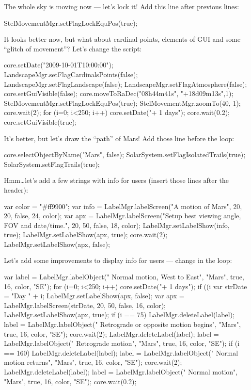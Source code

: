 The whole sky is moving now --- let's lock it! Add this line 
after previous lines:
\begin{script}
StelMovementMgr.setFlagLockEquPos(true);
\end{script}

It looks better now, but what about cardinal points, 
elements of GUI and some ``glitch of movement''? 
Let's change the script:
\begin{script}
core.setDate("2009-10-01T10:00:00");
LandscapeMgr.setFlagCardinalsPoints(false);
LandscapeMgr.setFlagLandscape(false);
LandscapeMgr.setFlagAtmosphere(false);
core.setGuiVisible(false);
core.moveToRaDec("08h44m41s", "+18d09m13s",1);
StelMovementMgr.setFlagLockEquPos(true);
StelMovementMgr.zoomTo(40, 1);
core.wait(2);
for (i=0; i<250; i++)
{
      core.setDate("+ 1 days");
      core.wait(0.2);
}
core.setGuiVisible(true);
\end{script}

It's better, but let's draw the ``path'' of Mars! Add 
those line before the loop:
\begin{script}
core.selectObjectByName("Mars", false);
SolarSystem.setFlagIsolatedTrails(true);
SolarSystem.setFlagTrails(true);
\end{script}

Hmm\ldots let's add a few strings with info for users (insert 
those lines after the header):
\begin{script}
var color = "#ff9900";
var info = LabelMgr.labelScreen("A motion of Mars", 20, 20, 
           false, 24, color);
var apx = LabelMgr.labelScreen("Setup best viewing angle, FOV 
          and date/time.", 20, 50, false, 18, color);
LabelMgr.setLabelShow(info, true);
LabelMgr.setLabelShow(apx, true);
core.wait(2);
LabelMgr.setLabelShow(apx, false);
\end{script}

Let's add some improvements to display info for users --- 
change in the loop:
\begin{script}
var label = LabelMgr.labelObject("  Normal motion, West to 
            East", "Mars", true, 16, color, "SE");
for (i=0; i<250; i++)
{
	core.setDate("+ 1 days");
	if ((i %
	{
		var strDate = "Day " + i;
		LabelMgr.setLabelShow(apx, false);
		var apx = LabelMgr.labelScreen(strDate, 20, 
				  50, false, 16, color);
		LabelMgr.setLabelShow(apx, true);
	}
	if (i == 75)
	{
		LabelMgr.deleteLabel(label);
		label = LabelMgr.labelObject("  Retrograde or 
		        opposite motion begins", "Mars", 
		        true, 16, color, "SE");
		core.wait(2);
		LabelMgr.deleteLabel(label);
		label = LabelMgr.labelObject("  Retrograde 
		        motion", "Mars", true, 16, color, 
		        "SE");
	}
	if (i == 160)
	{
		LabelMgr.deleteLabel(label);
		label = LabelMgr.labelObject("  Normal motion 
		        returns", "Mars", true, 16, color, 
		        "SE");
		core.wait(2);
		LabelMgr.deleteLabel(label);
		label = LabelMgr.labelObject("  Normal motion", 
		        "Mars", true, 16, color, "SE");
	}
	core.wait(0.2);
}
\end{script}

